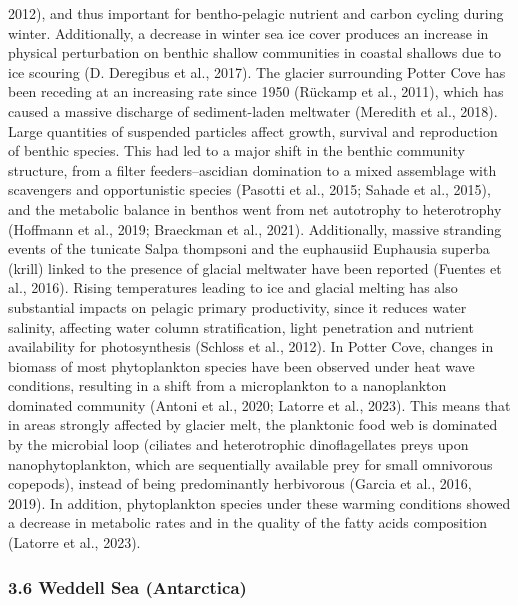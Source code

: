 \documentclass[
]{article}
\begin{document}
2012), and thus important for bentho-pelagic nutrient and carbon cycling
during winter. Additionally, a decrease in winter sea ice cover produces
an increase in physical perturbation on benthic shallow communities in
coastal shallows due to ice scouring (D. Deregibus et al., 2017). The
glacier surrounding Potter Cove has been receding at an increasing rate
since 1950 (Rückamp et al., 2011), which has caused a massive discharge
of sediment-laden meltwater (Meredith et al., 2018). Large quantities of
suspended particles affect growth, survival and reproduction of benthic
species. This had led to a major shift in the benthic community
structure, from a filter feeders--ascidian domination to a mixed
assemblage with scavengers and opportunistic species (Pasotti et al.,
2015; Sahade et al., 2015), and the metabolic balance in benthos went
from net autotrophy to heterotrophy (Hoffmann et al., 2019; Braeckman et
al., 2021). Additionally, massive stranding events of the tunicate Salpa
thompsoni and the euphausiid Euphausia superba (krill) linked to the
presence of glacial meltwater have been reported (Fuentes et al., 2016).
Rising temperatures leading to ice and glacial melting has also
substantial impacts on pelagic primary productivity, since it reduces
water salinity, affecting water column stratification, light penetration
and nutrient availability for photosynthesis (Schloss et al., 2012). In
Potter Cove, changes in biomass of most phytoplankton species have been
observed under heat wave conditions, resulting in a shift from a
microplankton to a nanoplankton dominated community (Antoni et al.,
2020; Latorre et al., 2023). This means that in areas strongly affected
by glacier melt, the planktonic food web is dominated by the microbial
loop (ciliates and heterotrophic dinoflagellates preys upon
nanophytoplankton, which are sequentially available prey for small
omnivorous copepods), instead of being predominantly herbivorous (Garcia
et al., 2016, 2019). In addition, phytoplankton species under these
warming conditions showed a decrease in metabolic rates and in the
quality of the fatty acids composition (Latorre et al., 2023).

\hypertarget{weddell-sea-antarctica}{%
\subsubsection{3.6 Weddell Sea
(Antarctica)}\label{weddell-sea-antarctica}}
\end{document}
